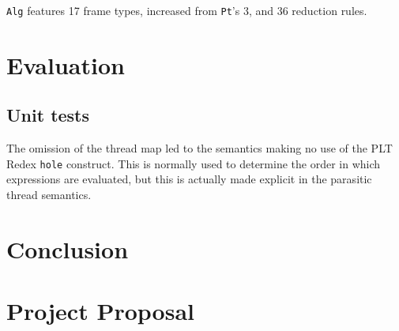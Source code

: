 \documentclass[12pt,a4paper,twoside,openright]{report}
\begin{document}
\texttt{Alg} features 17 frame types, increased from \texttt{Pt}'s 3, and 36 reduction rules.

\chapter{Evaluation}

\section{Unit tests}



The omission of the thread map led to the semantics making no use of the PLT Redex \texttt{hole} construct. This is normally used to determine the order in which expressions are evaluated, but this is actually made explicit in the parasitic thread semantics.

\chapter{Conclusion}






\appendix

\chapter{Project Proposal}
\end{document}
